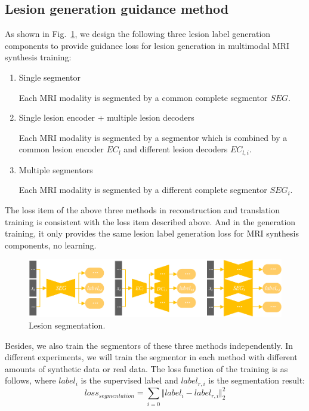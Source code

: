 \documentclass{ecai}
\begin{document}
\subsection{Lesion generation guidance method}
\label{label gen methods}
As shown in Fig.~\ref{segmentation}, we design the following three lesion label generation components to provide guidance loss for lesion generation in multimodal MRI synthesis training:
\begin{enumerate}
	\item{Single segmentor} 
	
	Each MRI modality  is segmented by a common complete segmentor $SEG$.
	\item{Single lesion encoder + multiple lesion decoders} 
	
	Each MRI modality  is segmented by a segmentor which is combined by a common lesion encoder $EC_{l}$ and different lesion decoders $EC_{l,i}$. 
	\item{Multiple segmentors} 
	
	Each MRI modality  is segmented by a different complete segmentor $SEG_i$.
\end{enumerate}
The loss item of the above three methods in reconstruction and translation training is consistent with the loss item described above. And in the generation training, it only provides the same lesion label generation loss for MRI synthesis components, no learning.

\begin{figure}
	\centering
	\includegraphics[width=0.98\columnwidth]{figures/segmentation}
	\caption{Lesion segmentation.}
	\label{segmentation}
\end{figure}
Besides, we also train the segmentors of these three methods independently. In different experiments, we will train the segmentor in each method with different amounts of synthetic data or real data. The loss function of the training is as follows, where $label_i$ is the supervised label and $label_{r,i}$ is the segmentation result:
\begin{equation}
	loss_{segmentation}=\sum\limits_{i=0}\Vert{label_i-label_{r,i}}\Vert_{2}^{2}
\end{equation}
\end{document}
